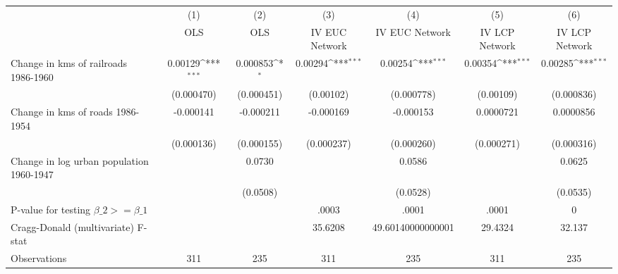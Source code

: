 {
\def\sym#1{\ifmmode^{#1}\else\(^{#1}\)\fi}
\begin{tabular}{l*{6}{c}}
\hline\hline
                &\multicolumn{1}{c}{(1)}&\multicolumn{1}{c}{(2)}&\multicolumn{1}{c}{(3)}&\multicolumn{1}{c}{(4)}&\multicolumn{1}{c}{(5)}&\multicolumn{1}{c}{(6)}\\
                &\multicolumn{1}{c}{OLS}&\multicolumn{1}{c}{OLS}&\multicolumn{1}{c}{IV EUC Network}&\multicolumn{1}{c}{IV EUC Network}&\multicolumn{1}{c}{IV LCP Network}&\multicolumn{1}{c}{IV LCP Network}\\
\hline
Change in kms of railroads 1986-1960&  0.00129\sym{***}& 0.000853\sym{*}  &  0.00294\sym{***}&  0.00254\sym{***}&  0.00354\sym{***}&  0.00285\sym{***}\\
                &(0.000470)         &(0.000451)         &(0.00102)         &(0.000778)         &(0.00109)         &(0.000836)         \\
[1em]
Change in kms of roads 1986-1954&-0.000141         &-0.000211         &-0.000169         &-0.000153         &0.0000721         &0.0000856         \\
                &(0.000136)         &(0.000155)         &(0.000237)         &(0.000260)         &(0.000271)         &(0.000316)         \\
[1em]
Change in log urban population 1960-1947&                  &   0.0730         &                  &   0.0586         &                  &   0.0625         \\
                &                  & (0.0508)         &                  & (0.0528)         &                  & (0.0535)         \\
\hline
P-value for testing $\beta\_{2} >= \beta\_{1}$&                  &                  &    .0003         &    .0001         &    .0001         &        0         \\
Cragg-Donald (multivariate) F-stat&                  &                  &  35.6208         &49.60140000000001         &  29.4324         &   32.137         \\
Observations    &      311         &      235         &      311         &      235         &      311         &      235         \\
\hline\hline
\end{tabular}
}

